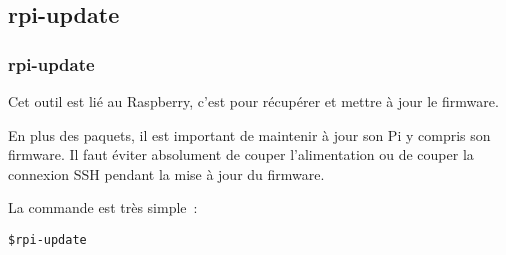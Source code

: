 \subsection{rpi-update}

\begin{frame}[containsverbatim]
\frametitle{rpi-update}

Cet outil est lié au Raspberry, c'est pour récupérer et mettre à jour le firmware.

En plus des paquets, il est important de maintenir à jour son Pi y compris son firmware. Il faut éviter absolument de couper l'alimentation ou de couper la connexion SSH pendant la mise à jour du firmware.

La commande est très simple~:

\begin{verbatim}
$rpi-update
\end{verbatim}

\end{frame}
